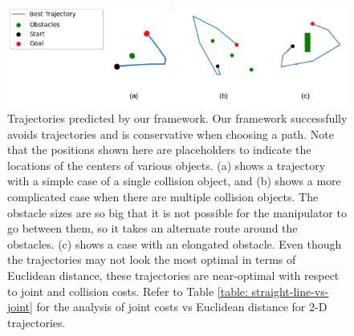\begin{figure}
    \centering \includegraphics[width=0.8\linewidth]{figures/bl-manipulator/trajectories-v2.png} 
    \caption[Bi-level optimizer trajectories]{Trajectories predicted by our framework. Our framework successfully avoids trajectories and is conservative when choosing a path. Note that the positions shown here are placeholders to indicate the locations of the centers of various objects. (a) shows a trajectory with a simple case of a single collision object, and (b) shows a more complicated case when there are multiple collision objects. The obstacle sizes are so big that it is not possible for the manipulator to go between them, so it takes an alternate route around the obstacles. (c) shows a case with an elongated obstacle. Even though the trajectories may not look the most optimal in terms of Euclidean distance, these trajectories are near-optimal with respect to joint and collision costs. Refer to Table \ref{table: straight-line-vs-joint} for the analysis of joint costs vs Euclidean distance for 2-D trajectories.}
    \label{fig: bl_qualitative}
\end{figure}

